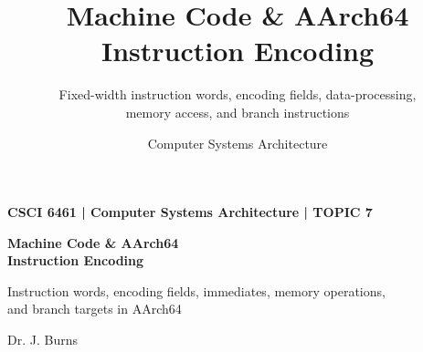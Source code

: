 \documentclass[aspectratio=169,11pt,t]{beamer}
\title[Topic 7]{
  Machine Code \& AArch64 Instruction Encoding
}
\subtitle{
  Fixed-width instruction words, encoding fields, data-processing,\\
  memory access, and branch instructions
}
\author{
  Computer Systems Architecture
}
\date{}
\begin{document}

\begin{frame}[plain]

\vspace*{\fill}

\begin{minipage}{0.88\textwidth}
{\color{gold}\normalsize\bfseries
CSCI 6461 \;|\; Computer Systems Architecture \;|\; TOPIC 7
\par}

\vspace{0.25cm}

{\color{white}\fontsize{24}{28}\selectfont\bfseries
Machine Code \& AArch64\\[0.08cm]Instruction Encoding
\par}

\vspace{0.35cm}

{\color{white!80}\large
Instruction words, encoding fields, immediates, memory operations,\\and branch targets in AArch64
\par}
\end{minipage}

\vfill

{\color{white!70}\small
Dr. J. Burns
\par}

\vspace*{\fill}
\end{frame}

\end{document}
